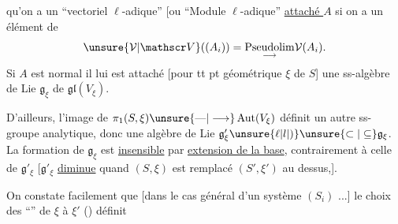 qu'on a un  ``vectoriel $\ell$-adique'' [ou ``Module $\ell$-adique''\unsure{)|]} \uline{attaché  $A$} si on a un élément de
\[
\unsure{\mathcal V|\mathscr V}((A_i))=\underset{\longrightarrow}{\operatorname{Pseudolim}}\mathcal V(A_i).
\]
Si $A$ est normal  il lui est attaché   [pour tt pt géométrique $\xi$ de $S$] une ss-algèbre de Lie $\mathfrak g_\xi$ de $\mathfrak{gl}(V_\xi)$.

D'ailleurs, l'image de $\pi_1(S,\xi)\unsure{\text{---}|\longrightarrow}\operatorname{Aut}(V_\xi)$ définit un autre ss-groupe analytique, donc une algèbre de Lie $\mathfrak g'_\xi\unsure{\ell|l|)}\unsure{\subset|\subseteq}\mathfrak g_\xi$. La formation de $\mathfrak g_\xi$ est  \uline{insensible} par \uline{extension  de la base}, contrairement à celle de $\mathfrak g'_\xi$ [$\mathfrak g'_\xi$ \uline{diminue} quand $(S,\xi)$ est remplacé  $(S',\xi')$ au dessus,].

On constate facilement que [dans le cas général d'un système $(S_i)$ ...]  le choix des  ``'' de $\xi$ à $\xi'$  () définit
